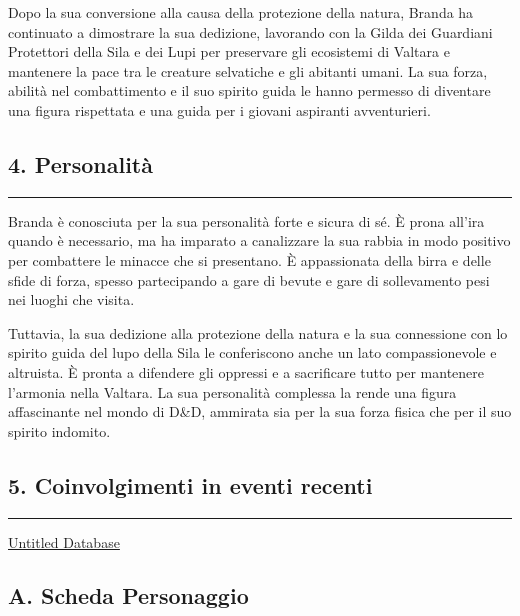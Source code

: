Dopo la sua conversione alla causa della protezione della natura, Branda
ha continuato a dimostrare la sua dedizione, lavorando con la Gilda dei
Guardiani Protettori della Sila e dei Lupi per preservare gli ecosistemi
di Valtara e mantenere la pace tra le creature selvatiche e gli abitanti
umani. La sua forza, abilità nel combattimento e il suo spirito guida le
hanno permesso di diventare una figura rispettata e una guida per i
giovani aspiranti avventurieri.

\subsection{4. Personalità}\label{personalituxe0}

\begin{center}\rule{0.5\linewidth}{0.5pt}\end{center}

Branda è conosciuta per la sua personalità forte e sicura di sé. È prona
all'ira quando è necessario, ma ha imparato a canalizzare la sua rabbia
in modo positivo per combattere le minacce che si presentano. È
appassionata della birra e delle sfide di forza, spesso partecipando a
gare di bevute e gare di sollevamento pesi nei luoghi che visita.

Tuttavia, la sua dedizione alla protezione della natura e la sua
connessione con lo spirito guida del lupo della Sila le conferiscono
anche un lato compassionevole e altruista. È pronta a difendere gli
oppressi e a sacrificare tutto per mantenere l'armonia nella Valtara. La
sua personalità complessa la rende una figura affascinante nel mondo di
D\&D, ammirata sia per la sua forza fisica che per il suo spirito
indomito.

\subsection{5. Coinvolgimenti in eventi
recenti}\label{coinvolgimenti-in-eventi-recenti}

\begin{center}\rule{0.5\linewidth}{0.5pt}\end{center}

\href{Untitled\%20Database\%20f3dd05aaeb4c4bcca93190b561e77cbd.csv}{Untitled
Database}

\subsection{A. Scheda Personaggio}\label{a.-scheda-personaggio}

